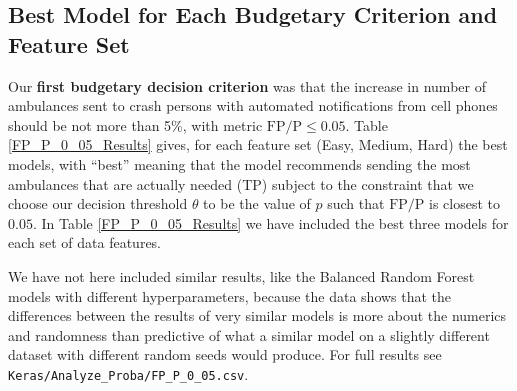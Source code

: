 \FloatBarrier


\subsection{Best Model for Each Budgetary Criterion and Feature Set}
\label{results_best_model}

Our {\bf first budgetary decision criterion} was that the increase in number of ambulances sent to crash persons with automated notifications from cell phones should be not more than 5\%, with metric $\text{FP}/\text{P} \le 0.05$.  Table \ref{FP_P_0_05_Results} gives, for each feature set (Easy, Medium, Hard) the best models, with ``best'' meaning that the model recommends sending the most ambulances that are actually needed (TP) subject to the constraint that we choose our decision threshold $\theta$ to be the value of $p$ such that  $\text{FP}/\text{P}$ is closest to $0.05$.  In Table \ref{FP_P_0_05_Results} we have included the best three models for each set of data features.

We have not here included similar results, like the Balanced Random Forest models with different hyperparameters, because the data shows that the differences between the results of very similar models is more about the numerics and randomness than predictive of what a similar model on a slightly different dataset with different random seeds would produce.  For full results see \verb|Keras/Analyze_Proba/FP_P_0_05.csv|.


